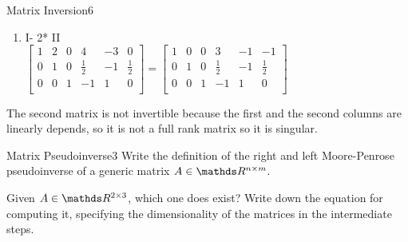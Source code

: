 \begin{questions}
\begin{question}{Matrix Inversion}{6}
\begin{answer}
\begin{enumerate}
		\item I- 2* II \\
		\bigskip
		$	
		\left[\begin{array}{ccc|ccc}
		1 & 2 & 0 & 4&-3&0    \\       
		0& 1 & 0 & \frac{1}{2}&-1&\frac{1}{2}    \\       
		0& 0 & 1 & -1&1&0     \\      
		\end{array} \right]=
		\left[\begin{array}{ccc|ccc}
		1 & 0 & 0 & 3&-1&-1    \\       
		0& 1 & 0 & \frac{1}{2}&-1&\frac{1}{2}    \\       
		0& 0 & 1 & -1&1&0     \\      
		\end{array} \right]
		$
	\end{enumerate}
 
 The second matrix is not invertible because the first and the second columns are linearly depends, so it is not a full rank matrix  so it is singular.
\end{answer}

\end{question}
	

\begin{question}{Matrix Pseudoinverse}{3}
	Write the definition of the right and left Moore-Penrose pseudoinverse of a generic matrix $A \in \R^{n\times m}$.
	
	Given $A \in \R^{2 \times 3}$, which one does exist? Write down the equation for computing it, specifying the dimensionality of the matrices in the intermediate steps.
	

\end{question}
\end{questions}
